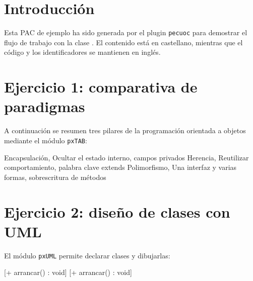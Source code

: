 


\section{Introducción}
Esta PAC de ejemplo ha sido generada por el plugin \texttt{pecuoc} para demostrar
el flujo de trabajo con la clase \PECTeX. El contenido está en castellano, mientras
que el código y los identificadores se mantienen en inglés.

\section{Ejercicio 1: comparativa de paradigmas}
A continuación se resumen tres pilares de la programación orientada a objetos
mediante el módulo \texttt{pxTAB}:

%
  {Encapsulación, Ocultar el estado interno, campos privados}%
  {Herencia, Reutilizar comportamiento, palabra clave extends}%
  {Polimorfismo, Una interfaz y varias formas, sobrescritura de métodos}

\section{Ejercicio 2: diseño de clases con UML}
El módulo \texttt{pxUML} permite declarar clases y dibujarlas:

[+ arrancar() : void]
[+ arrancar() : void]



